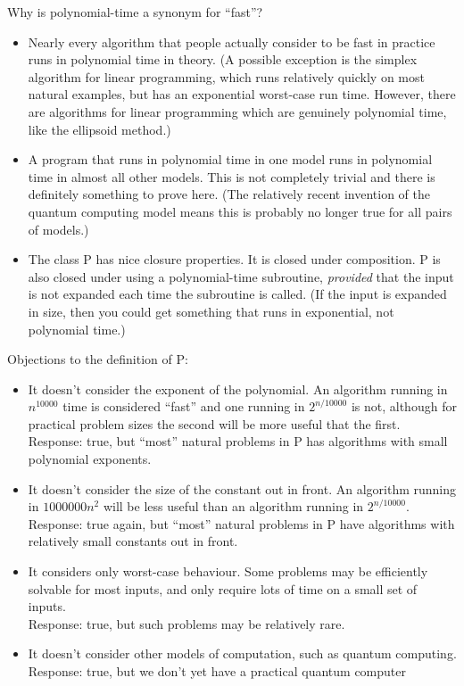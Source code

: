 \documentclass[12pt]{article}
\theoremstyle{plain}
\theoremstyle{definition}
\begin{document}
Why is polynomial-time a synonym for ``fast''?
\begin{itemize}
  \item Nearly every algorithm that people actually consider to be fast in practice runs in polynomial time in theory.
  (A possible exception is the simplex algorithm for linear programming, which runs relatively quickly on most natural examples, but has an exponential worst-case run time.
  However, there are algorithms for linear programming which are genuinely polynomial time, like the ellipsoid method.)

  \item A program that runs in polynomial time in one model runs in polynomial time in almost all other models.
  This is not completely trivial and there is definitely something to prove here.
  (The relatively recent invention of the quantum computing model means this is probably no longer true for all pairs of models.)

  \item The class P has nice closure properties.
  It is closed under composition.
  P is also closed under using a polynomial-time subroutine, \emph{provided} that the input is not expanded each time the subroutine is called. (If the input is expanded in size, then you could get something that runs in exponential, not polynomial time.)
\end{itemize}

Objections to the definition of P:
\begin{itemize}
  \item It doesn't consider the exponent of the polynomial.
  An algorithm running in $n^{10000}$ time is considered ``fast'' and one running in $2^{n/10000}$ is not, although for practical problem sizes the second will be more useful that the first. \\
  Response: true, but ``most'' natural problems in P has algorithms with small polynomial exponents.

  \item It doesn't consider the size of the constant out in front.
  An algorithm running in $1000000n^{2}$ will be less useful than an algorithm running in $2^{n/10000}$. \\
  Response: true again, but ``most'' natural problems in P have algorithms with relatively small constants out in front.

  \item It considers only worst-case behaviour.
  Some problems may be efficiently solvable for most inputs, and only require lots of time on a small set of inputs. \\
  Response: true, but such problems may be relatively rare.

  \item It doesn't consider other models of computation, such as quantum computing. \\
  Response: true, but we don't yet have a practical quantum computer
\end{itemize}
\end{document}

